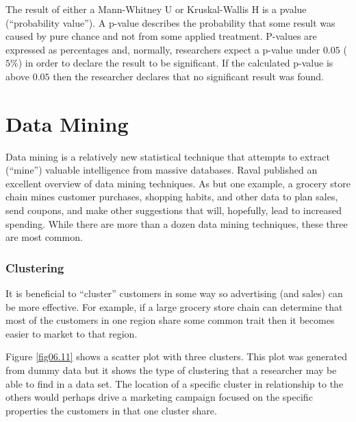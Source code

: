 The result of either a Mann-Whitney U or Kruskal-Wallis H is a \gls{pvalue} (``probability value''). A p-value describes the probability that some result was caused by pure chance and not from some applied treatment. P-values are expressed as percentages and, normally, researchers expect a p-value under $ 0.05 $ ($ 5\% $) in order to declare the result to be significant. If the calculated p-value is above $ 0.05 $ then the researcher declares that no significant result was found.

\section{Data Mining}

Data mining is a relatively new statistical technique that attempts to extract (``mine'') valuable intelligence from massive databases. Raval\cite{raval2012data} published an excellent overview of data mining techniques. As but one example, a grocery store chain mines customer purchases, shopping habits, and other data to plan sales, send coupons, and make other suggestions that will, hopefully, lead to increased spending. While there are more than a dozen data mining techniques, these three are most common.

\subsubsection{Clustering}

It is beneficial to ``cluster'' customers in some way so advertising (and sales) can be more effective. For example, if a large grocery store chain can determine that most of the customers in one region share some common trait then it becomes easier to market to that region.

Figure \ref{fig06.11} shows a scatter plot with three clusters. This plot was generated from dummy data but it shows the type of clustering that a researcher may be able to find in a data set. The location of a specific cluster in relationship to the others would perhaps drive a marketing campaign focused on the specific properties the customers in that one cluster share.

